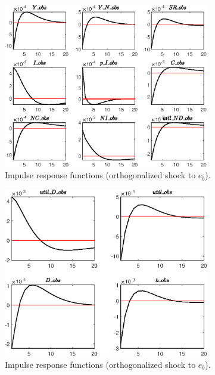 \begin{figure}[H]
\centering 
\includegraphics[width=0.80\textwidth]{BRS_sectoral/graphs/BRS_sectoral_IRF_e_b1}
\caption{Impulse response functions (orthogonalized shock to ${e_b}$).}\label{Fig:IRF:e_b:1}
\end{figure}
 
\begin{figure}[H]
\centering 
\includegraphics[width=0.80\textwidth]{BRS_sectoral/graphs/BRS_sectoral_IRF_e_b2}
\caption{Impulse response functions (orthogonalized shock to ${e_b}$).}\label{Fig:IRF:e_b:2}
\end{figure}
 
